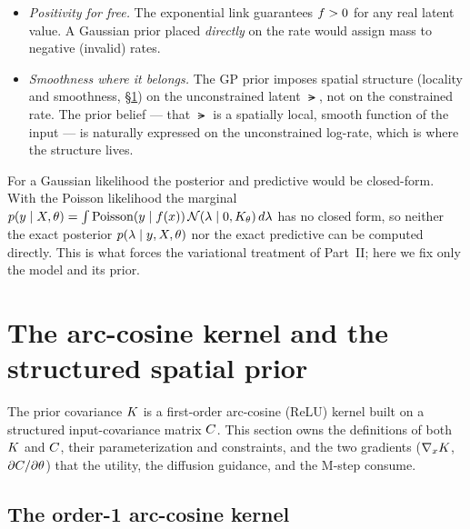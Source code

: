 \begin{itemize}[leftmargin=1.4em]
\item \emph{Positivity for free.} The exponential link guarantees $f>0$ for any
  real latent value. A Gaussian prior placed \emph{directly} on the rate would
  assign mass to negative (invalid) rates.
\item \emph{Smoothness where it belongs.} The GP prior imposes spatial structure
  (locality and smoothness, \S\ref{sec:kernel}) on the unconstrained latent
  $\lat$, not on the constrained rate. The prior belief --- that $\lat$ is a
  spatially local, smooth function of the input --- is naturally expressed on the
  unconstrained log-rate, which is where the structure lives.
\end{itemize}

\begin{remark}
For a Gaussian likelihood the posterior and predictive would be closed-form. With
the Poisson likelihood the marginal
$p(y\mid X,\theta)=\int \mathrm{Poisson}(y\mid f(x))\,\mathcal{N}(\lambda\mid0,K_\theta)\,d\lambda$
has no closed form, so neither the exact posterior $p(\lambda\mid y,X,\theta)$ nor
the exact predictive can be computed directly. This is what forces the variational
treatment of Part~II; here we fix only the model and its prior.
\end{remark}


\section{The arc-cosine kernel and the structured spatial prior}
\label{sec:kernel}

The prior covariance $K$ is a first-order arc-cosine (ReLU) kernel built on a
structured input-covariance matrix $C$. This section owns the definitions of
both $K$ and $C$, their parameterization and constraints, and the two
gradients ($\nabla_xK$, $\partial C/\partial\theta$) that the utility, the
diffusion guidance, and the M-step consume.

\subsection{The order-1 arc-cosine kernel}
\label{subsec:acos}

